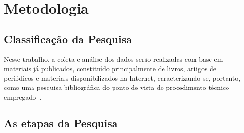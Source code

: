 \section{Metodologia}

\subsection{Classificação da Pesquisa}

Neste trabalho, a coleta e análise dos dados serão realizadas com base em  materiais já publicados, constituído principalmente de livros, artigos de periódicos e  materiais disponibilizados na Internet, caracterizando-se, portanto, como uma pesquisa bibliográfica do ponto de vista do procedimento técnico empregado~\cite{gil1991}.


\subsection{As etapas da Pesquisa}


